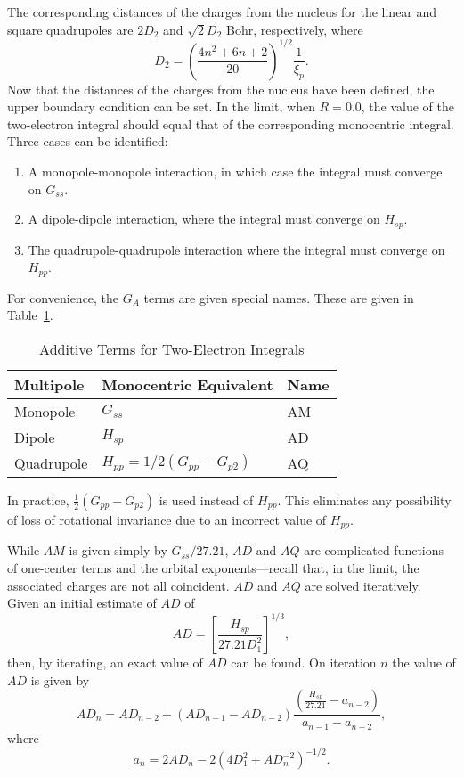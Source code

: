 \documentclass[a4paper]{book}
\begin{document}
The corresponding distances of the charges from the
nucleus for the linear and square quadrupoles are $2D_2$ and
$\sqrt{2}D_2$ Bohr, respectively, where
$$
D_2=\left(\frac{4n^2+6n+2}{20}\right)^{1/2}\frac{1}{\xi_p}.
$$
 Now that the distances of the charges from the nucleus
have been defined, the upper boundary condition can be set.
In the limit, when $R=0.0$, the value of the two-electron
integral should equal that of the corresponding monocentric
integral. Three cases can be identified:
\begin{enumerate}
\item  A monopole-monopole interaction, in which case the
integral must converge on $G_{ss}$.
\item A dipole-dipole interaction, where the integral must
converge on $H_{sp}$.
\item The quadrupole-quadrupole interaction where the
integral must converge on $H_{pp}$.
\end{enumerate}
 For convenience, the $G_A$ terms are given special names.
These are given in Table~\ref{aa}.
\begin{table}
\caption{\label{aa} Additive Terms for Two-Electron Integrals}
\begin{center}
\begin{tabular}{lll} \hline
 Multipole & Monocentric Equivalent & Name  \\ \hline
 Monopole  & $G_{ss}$ &  AM  \\
 Dipole &  $H_{sp}$ &  AD  \\
 Quadrupole &  $H_{pp} =1/2(G_{pp}-G_{p2})$ & AQ \\ \hline
\end{tabular}
\end{center}
\end{table}
 In practice, $\frac{1}{2}(G_{pp}-G_{p2})$ is used instead of $H_{pp}$.
This eliminates any
possibility of loss of rotational invariance due to an incorrect value
of  $H_{pp}$.

 While $AM$ is given simply by $G_{ss}/27.21$, $AD$ and $AQ$ are
complicated functions of one-center terms and the orbital
exponents---recall that, in the limit, the associated
charges are not all coincident. $AD$ and $AQ$ are solved
iteratively. Given an initial estimate of $AD$ of
$$
AD = \left[\frac{H_{sp}}{27.21D^2_1}\right]^{1/3},
$$
then, by iterating, an exact value of $AD$ can be found. On
iteration $n$ the value of $AD$ is given by
$$
AD_n = AD_{n-2}+(AD_{n-1}-AD_{n-2})\frac{(\frac{H_{sp}}{27.21}-a_{n-2})}{a_{n-1}-a_{n-2}},
$$
where
$$
a_n=2AD_n-2(4D^2_1+AD^{-2}_n)^{-1/2}.
$$
\end{document}

